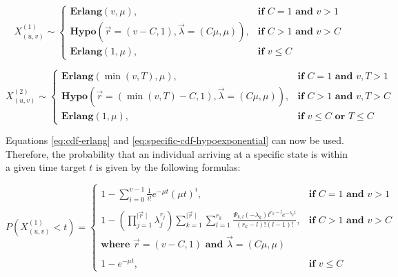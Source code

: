 \begin{equation}
    X_{(u,v)}^{(1)} \sim 
    \begin{cases}
        \textbf{Erlang}(v, \mu), & \textbf{if } C = 1 \textbf{ and } v>1 \\
        \textbf{Hypo}\left(\vec{r}=(v - C, 1), \vec{\lambda}=(C \mu, \mu)\right), 
            & \textbf{if } C > 1 \textbf{ and } v>C \\
        \textbf{Erlang}(1, \mu), & \textbf{if } v \leq C
    \end{cases}
\end{equation}

\begin{equation}
    X_{(u,v)}^{(2)} \sim 
    \begin{cases}
        \textbf{Erlang}(\min(v, T), \mu), & \textbf{if } C = 1
            \textbf{ and } v, T > 1 \\
        \textbf{Hypo}\left(\vec{r}=(\min(v, T) - C, 1), \vec{\lambda}=(C \mu, \mu)\right), & 
            \textbf{if } C > 1 \textbf{ and } v, T  > C \\
        \textbf{Erlang}(1, \mu), & \textbf{if } v \leq C \textbf{ or } T \leq C
    \end{cases}
\end{equation}


Equations \ref{eq:cdf-erlang} and \ref{eq:specific-cdf-hypoexponential} can now
be used.
Therefore, the probability that an individual arriving at a specific state is 
within a given time target \(t\) is given by the following formulas:


\begin{equation}
    P(X_{(u,v)}^{(1)} < t) = 
    \begin{cases}
        1 - \sum_{i=0}^{v-1} \frac{1}{i!} e^{-\mu t} (\mu t)^i, 
            & \textbf{if } C = 1 \textbf{ and } v>1 \\
        & \\
        1 - \left( \prod_{j=1}^{\mid \vec{r} \mid} \lambda_j^{r_j} \right) 
            \sum_{k=1}^{\mid \vec{r} \mid} \sum_{l=1}^{r_k}
            \frac{\Psi_{k,l}(-\lambda_k)t^{r_k - l} 
            e^{-\lambda_k t}}{(r_k - l)! (l - 1)!},
            & \textbf{if } C > 1 \textbf{ and } v > C \\
        \textbf{where } \vec{r}=(v - C, 1) \textbf{ and } 
            \vec{\lambda}=(C \mu, \mu) & \\
        & \\
        1 - e^{-\mu t},  & \textbf{if } v \leq C
    \end{cases}
\end{equation}


